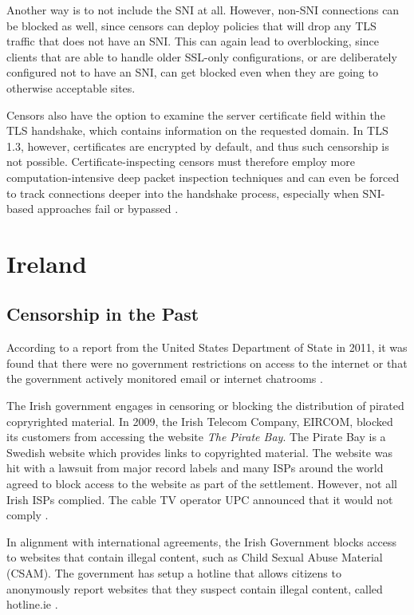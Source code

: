 Another way is to not include the SNI at all. However, non-SNI connections can be blocked as well, since censors can deploy policies that will drop any TLS traffic that does not have an SNI. This can again lead to overblocking, since clients that are able to handle older SSL-only configurations, or are deliberately configured not to have an SNI, can get blocked even when they are going to otherwise acceptable sites.

Censors also have the option to examine the server certificate field within the TLS handshake, which contains information on the requested domain. In TLS 1.3, however, certificates are encrypted by default, and thus such censorship is not possible. Certificate-inspecting censors must therefore employ more computation-intensive deep packet inspection techniques and can even be forced to track connections deeper into the handshake process, especially when SNI-based approaches fail or bypassed \cite{rfc9505}.

\section{Ireland}

\subsection{Censorship in the Past}

According to a report from the United States Department of State in 2011, it was found that there were no government restrictions on access to the internet or that the government actively monitored email or internet chatrooms \cite{stateTechnicalDifficulties}.

The Irish government engages in censoring or blocking the distribution of pirated copryrighted material. In 2009, the Irish Telecom Company, EIRCOM, blocked its customers from accessing the website \textit{The Pirate Bay}. The Pirate Bay is a Swedish website which provides links to copyrighted material. The website was hit with a lawsuit from major record labels and many ISPs around the world agreed to block access to the website as part of the settlement. However, not all Irish ISPs complied. The cable TV operator UPC announced that it would not comply \cite{irishtimesEircomBlock}. 

In alignment with international agreements, the Irish Government blocks access to websites that contain illegal content, such as Child Sexual Abuse Material (CSAM). The government has setup a hotline that allows citizens to anonymously report websites that they suspect contain illegal content, called hotline.ie \cite{hotlineAboutx2013}.

